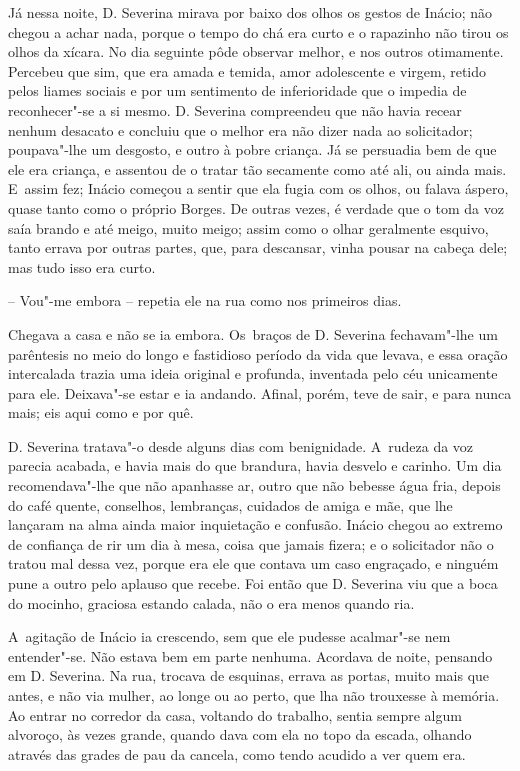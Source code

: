 Já nessa noite, D. Severina mirava por baixo dos olhos os gestos de
Inácio; não chegou a achar nada, porque o tempo do chá era curto e o
rapazinho não tirou os olhos da xícara. No dia seguinte pôde observar
melhor, e nos outros otimamente. Percebeu que sim, que era amada e
temida, amor adolescente e virgem, retido pelos liames sociais e por um
sentimento de inferioridade que o impedia de reconhecer"-se a si mesmo.
D. Severina compreendeu que não havia recear nenhum desacato e concluiu
que o melhor era não dizer nada ao solicitador; poupava"-lhe um desgosto,
e outro à pobre criança. Já se persuadia bem de que ele era criança, e
assentou de o tratar tão secamente como até ali, ou ainda mais. E~assim
fez; Inácio começou a sentir que ela fugia com os olhos, ou falava
áspero, quase tanto como o próprio Borges. De outras vezes, é verdade
que o tom da voz saía brando e até meigo, muito meigo; assim como o
olhar geralmente esquivo, tanto errava por outras partes, que, para
descansar, vinha pousar na cabeça dele; mas tudo isso era curto.

-- Vou"-me embora -- repetia ele na rua como nos primeiros dias.

Chegava a casa e não se ia embora. Os~braços de D. Severina fechavam"-lhe
um parêntesis no meio do longo e fastidioso período da vida que levava,
e essa oração intercalada trazia uma ideia original e profunda,
inventada pelo céu unicamente para ele. Deixava"-se estar e ia andando.
Afinal, porém, teve de sair, e para nunca mais; eis aqui como e por quê.

D. Severina tratava"-o desde alguns dias com benignidade. A~rudeza da voz
parecia acabada, e havia mais do que brandura, havia desvelo e carinho.
Um dia recomendava"-lhe que não apanhasse ar, outro que não bebesse água
fria, depois do café quente, conselhos, lembranças, cuidados de amiga e
mãe, que lhe lançaram na alma ainda maior inquietação e confusão. Inácio
chegou ao extremo de confiança de rir um dia à mesa, coisa que jamais
fizera; e o solicitador não o tratou mal dessa vez, porque era ele que
contava um caso engraçado, e ninguém pune a outro pelo aplauso que
recebe. Foi então que D. Severina viu que a boca do mocinho, graciosa
estando calada, não o era menos quando ria.

A~agitação de Inácio ia crescendo, sem que ele pudesse acalmar"-se nem
entender"-se. Não estava bem em parte nenhuma. Acordava de noite,
pensando em D. Severina. Na rua, trocava de esquinas, errava as portas,
muito mais que antes, e não via mulher, ao longe ou ao perto, que lha
não trouxesse à memória. Ao entrar no corredor da casa, voltando do
trabalho, sentia sempre algum alvoroço, às vezes grande, quando dava com
ela no topo da escada, olhando através das grades de pau da cancela,
como tendo acudido a ver quem era.

